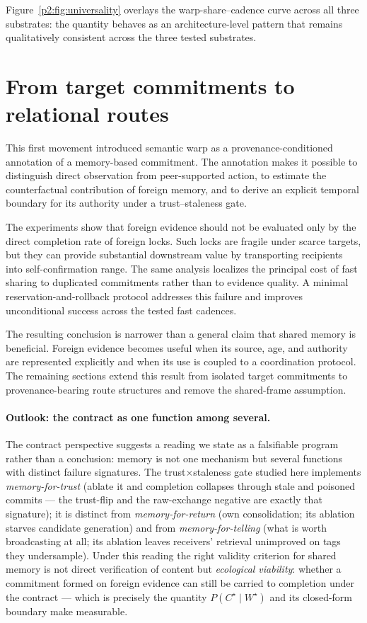 \documentclass{article}
\newcommand{\wstar}{W^{\star}}
\newcommand{\cstar}{C^{\star}}
\begin{document}
Figure~\ref{p2:fig:universality} overlays the warp-share--cadence curve
across all three substrates: the quantity behaves as an
architecture-level pattern that remains qualitatively consistent
across the three tested substrates.


\section{From target commitments to relational routes}
\label{p2:sec:bridge}

This first movement introduced semantic warp as a provenance-conditioned
annotation of a memory-based commitment. The annotation makes it
possible to distinguish direct observation from peer-supported action,
to estimate the counterfactual contribution of foreign memory, and to
derive an explicit temporal boundary for its authority under a
trust--staleness gate.

The experiments show that foreign evidence should not be evaluated
only by the direct completion rate of foreign locks. Such locks are
fragile under scarce targets, but they can provide substantial
downstream value by transporting recipients into self-confirmation
range. The same analysis localizes the principal cost of fast sharing
to duplicated commitments rather than to evidence quality. A minimal
reservation-and-rollback protocol addresses this failure and improves
unconditional success across the tested fast cadences.

The resulting conclusion is narrower than a general claim that shared
memory is beneficial. Foreign evidence becomes useful when its source,
age, and authority are represented explicitly and when its use is
coupled to a coordination protocol. The remaining sections extend this
result from isolated target commitments to provenance-bearing route
structures and remove the shared-frame assumption.

\paragraph{Outlook: the contract as one function among several.}
The contract perspective suggests a reading we state as a
falsifiable program rather than a conclusion: memory is not one
mechanism but several functions with distinct failure signatures.
The trust$\times$staleness gate studied here implements
\emph{memory-for-trust} (ablate it and completion collapses through
stale and poisoned commits --- the trust-flip and the raw-exchange
negative are exactly that signature); it is distinct from
\emph{memory-for-return} (own consolidation; its ablation starves
candidate generation) and from \emph{memory-for-telling} (what is
worth broadcasting at all; its ablation leaves receivers'
retrieval unimproved on tags they undersample). Under this reading
the right validity criterion for shared memory is not direct
verification of content but \emph{ecological viability}: whether a
commitment formed on foreign evidence can still be carried to
completion under the contract --- which is precisely the quantity
$P(\cstar \mid \wstar)$ and its closed-form boundary make measurable.
\end{document}
